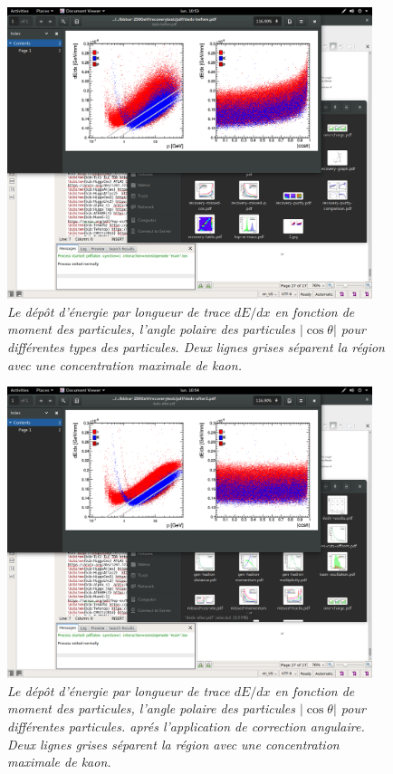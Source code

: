 \begin{figure}
	{\centering
		\includegraphics[clip, trim=8cm 18.5cm 7cm 4cm,width=0.95\textwidth]{ILD/plots/dedx-before.png}
		\caption{\sl Le dépôt d'énergie par longueur de trace $dE/dx$ en fonction de moment des particules, l'angle polaire des particules $|\cos\theta|$ pour différentes types des particules. Deux lignes grises séparent la région avec une concentration maximale de kaon.
		}
		\label{fig:dEdxBefore_3F}
	}
\end{figure}

\begin{figure}
	{\centering
		\includegraphics[clip, trim=8cm 18.5cm 7cm 4cm, width=0.95\textwidth]{ILD/plots/dedx-after.png}
		\caption{\sl Le dépôt d'énergie par longueur de trace $dE/dx$ en fonction de moment des particules, l'angle polaire des particules $|\cos\theta|$ pour différentes particules. apr\'es l'application de correction angulaire.  Deux lignes grises séparent la région avec une concentration maximale de kaon.
		}
		\label{fig:dEdxAfter_3F}
	}
\end{figure}


